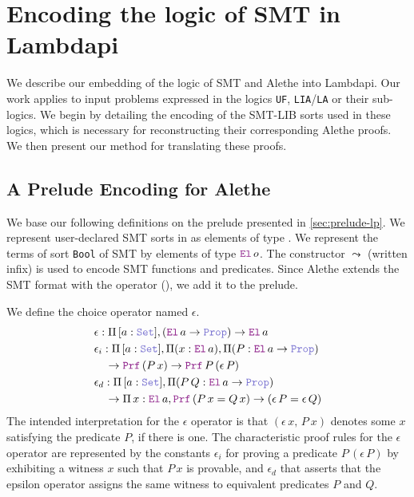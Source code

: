 
\chapter{Encoding the logic of SMT in Lambdapi} \label{ch:encoding}

We describe our embedding of the logic of SMT and Alethe into Lambdapi.
Our work applies to input problems expressed in the logics \texttt{UF}, \texttt{LIA}/\texttt{LA} or their sub-logics.
We begin by detailing the encoding of the SMT-LIB sorts used in these logics, which is necessary for reconstructing their corresponding Alethe proofs.
We then present our method for translating these proofs.

\section{A Prelude Encoding for Alethe}
\label{sec:encoding-prelude}

We base our following definitions on the prelude presented in \cref{sec:prelude-lp}.
We represent user-declared SMT sorts in \lpm{} as elements of type \set{}. We represent the terms of sort \lstinline[language=SMT,basicstyle=\ttfamily\normalsize]|Bool| of SMT by elements of type $\el{}\,o$.
The constructor $\leadsto$ (written infix) is used to encode SMT functions and predicates.
Since Alethe extends the SMT format with the  operator (\cite[\S 2.1]{alethespec}), we add it to the prelude. 

\begin{definition} \label{def:eps}
We define the choice operator named $\epsilon$.
\begin{align}
& \epsilon: \Pi\, {[a: \set]}, (\el\,a \ra \prop) \ra \el\,a \\
& \epsilon_i: \Pi\, {[a: \set]}, \Pi (x : \el\,a), \Pi (P : \el\,a \ra \prop) \\
& \quad \ra \prf\,(P\,x) \ra \prf\, P\,(\epsilon\,P)  \notag\\
& \epsilon_{d}: \Pi\, {[a: \set]}, \Pi (P\,Q : \el\,a \ra \prop) \\
& \quad \ra \Pi\, x : \el\,a, \prf\,(P\,x = Q\,x) \ra (\epsilon \, P = \epsilon \, Q)  \notag
\end{align}
The intended interpretation for the $\epsilon$ operator is that $(\epsilon\,x,\, P~x)$ denotes some $x$ satisfying the predicate $P$, if there is one.
The characteristic proof rules for the $\epsilon$ operator are represented by the constants $\epsilon_i$ for proving a predicate $P\,(\epsilon\,P)$ by exhibiting a witness $x$ such that $P\,x$ is provable,
and $\epsilon_d$ that asserts that the epsilon operator assigns the same witness to equivalent predicates $P$ and $Q$.
\end{definition}


